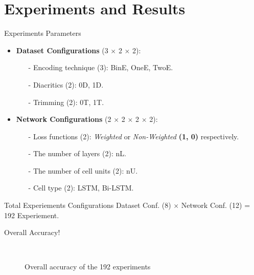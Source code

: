 \section{Experiments and Results}

\begin{frame}[fragile]{Experiments Parameters}
\begin{itemize}
	\item \textbf{Dataset Configurations} (3 $\times$ 2 $\times$ 2):
	\begin{itemize}
		\item [-] Encoding technique (3): BinE, OneE, TwoE.
		\item [-] Diacritics (2): 0D, 1D.
		\item [-] Trimming (2): 0T, 1T.
	\end{itemize}
\item \textbf{Network Configurations} (2 $\times$ 2 $\times$ 2 $\times$ 2):
\begin{itemize}
\item [-] Loss functions (2): \textit{Weighted} or \textit{Non-Weighted } \textbf{(1, 0)} respectively.
\item [-] The number of layers (2): nL.
\item [-] The number of cell units (2): nU.
\item [-] Cell type (2): LSTM, Bi-LSTM.
\end{itemize}
\end{itemize}
\begin{block}{Total Experiements Configurations}
	Dataset Conf. (8) $\times$ Network Conf. (12) = 192 Experiement.
\end{block}
\end{frame}
\begin{frame}[fragile]{Overall Accuracy!}


\begin{figure}[!t]
	
	\caption{Overall accuracy of the 192 experiments}~\label{Fig:ArabicModelsResults}
\end{figure}

\end{frame}

